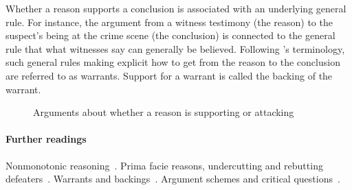 \documentclass[10pt]{article}
\begin{document}
Whether a reason supports a conclusion is associated with an underlying general rule. For instance, the argument from a witness testimony (the reason) to the suspect's being at the crime scene (the conclusion) is connected to the general rule that what witnesses say can generally be believed. Following \cite{toulmin1958}'s terminology, such general rules making explicit how to get from the reason to the conclusion are referred to as warrants. Support for a warrant is called the backing of the warrant.

\begin{figure}[bt]
\centering

\caption{Arguments about whether a reason is supporting or attacking\label{fig:nesting}}
\end{figure}

\paragraph{Further readings} Nonmonotonic reasoning~\citep{gabbayEtal1994}. Prima facie reasons, undercutting and rebutting defeaters~\citep{pollock1987, pollock1995}. Warrants and backings~\citep{toulmin1958}. Argument schemes and critical questions~\citep{waltonReedMacagno2008}. 
\end{document}
